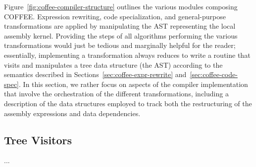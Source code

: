 Figure~\ref{fig:coffee-compiler-structure} outlines the various modules composing COFFEE. Expression rewriting, code specialization, and general-purpose transformations are applied by manipulating the AST representing the local assembly kernel. Providing the steps of all algorithms performing the various transformations would just be tedious and marginally helpful for the reader; essentially, implementing a transformation always reduces to write a routine that visits and manipulates a tree data structure (the AST) according to the semantics described in Sections~\ref{sec:coffee-expr-rewrite} and~\ref{sec:coffee-code-spec}. In this section, we rather focus on aspects of the compiler implementation that involve the orchestration of the different transformations, including a description of the data structures employed to track both the restructuring of the assembly expressions and data dependencies. 


\subsection{Tree Visitors}
...

